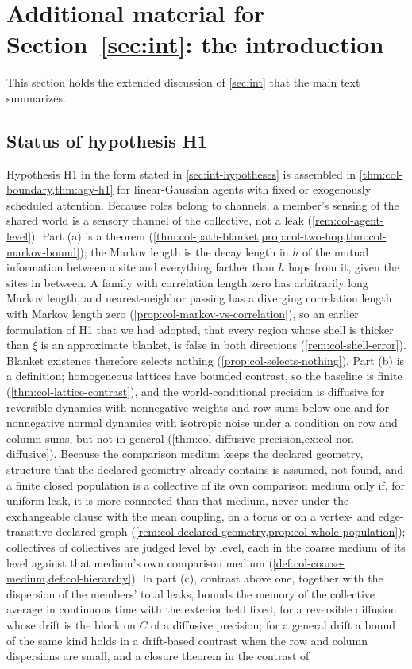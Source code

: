 \section{Additional material for \texorpdfstring{Section~\ref{sec:int}}{Section 1}: the introduction}\label{sup:int}

This section holds the extended discussion of \cref{sec:int} that the main text summarizes.

\subsection{Status of hypothesis H1}\label{sup:int-status-of-hypothesis-h1}

Hypothesis H1 in the form stated in \cref{sec:int-hypotheses} is assembled in \cref{thm:col-boundary,thm:agy-h1} for linear-Gaussian agents with fixed or exogenously scheduled attention. Because roles belong to channels, a member's sensing of the shared world is a sensory channel of the collective, not a leak (\cref{rem:col-agent-level}). Part (a) is a theorem (\cref{thm:col-path-blanket,prop:col-two-hop,thm:col-markov-bound}); the Markov length is the decay length in $h$ of the mutual information between a site and everything farther than $h$ hops from it, given the sites in between. A family with correlation length zero has arbitrarily long Markov length, and nearest-neighbor passing has a diverging correlation length with Markov length zero (\cref{prop:col-markov-vs-correlation}), so an earlier formulation of H1 that we had adopted, that every region whose shell is thicker than $\xi$ is an approximate blanket, is false in both directions (\cref{rem:col-shell-error}). Blanket existence therefore selects nothing (\cref{prop:col-selects-nothing}). Part (b) is a definition; homogeneous lattices have bounded contrast, so the baseline is finite (\cref{thm:col-lattice-contrast}), and the world-conditional precision is diffusive for reversible dynamics with nonnegative weights and row sums below one and for nonnegative normal dynamics with isotropic noise under a condition on row and column sums, but not in general (\cref{thm:col-diffusive-precision,ex:col-non-diffusive}). Because the comparison medium keeps the declared geometry, structure that the declared geometry already contains is assumed, not found, and a finite closed population is a collective of its own comparison medium only if, for uniform leak, it is more connected than that medium, never under the exchangeable clause with the mean coupling, on a torus or on a vertex- and edge-transitive declared graph (\cref{rem:col-declared-geometry,prop:col-whole-population}); collectives of collectives are judged level by level, each in the coarse medium of its level against that medium's own comparison medium (\cref{def:col-coarse-medium,def:col-hierarchy}). In part (c), contrast above one, together with the dispersion of the members' total leaks, bounds the memory of the collective average in continuous time with the exterior held fixed, for a reversible diffusion whose drift is the block on $C$ of a diffusive precision; for a general drift a bound of the same kind holds in a drift-based contrast when the row and column dispersions are small, and a closure theorem in the contrast of 